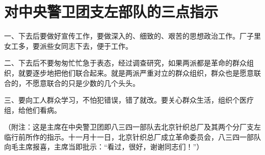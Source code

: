 \section[对中央警卫团支左部队的三点指示（一九六七年六月二十六日）]{对中央警卫团支左部队的三点指示}


一、下去后要做好宣传工作，要做深入的、细致的、艰苦的思想政治工作。厂子里女工多，要派些女同志下去，便于工作。

二、下去后不要匆匆忙忙急于表态，经过调查研究，如果两派都是革命的群众组织，就要逐步地把他们联合起来。就是两派严重对立的群众组织，群众也是愿意联合的，不愿意联合的只是少数的几个头头。

三、要向工人群众学习，不怕犯错误，错了就改。要关心群众生活，组织个医疗组，给他们看病。

（附注：这是主席在中央警卫团即八三四一部队去北京针织总厂及其两个分厂支左临行前所作的指示。十一月十一日，北京针织总厂成立革命委员会，八三四一部队向毛主席报喜，主席当即批示：“看过，很好，谢谢同志们！”）


